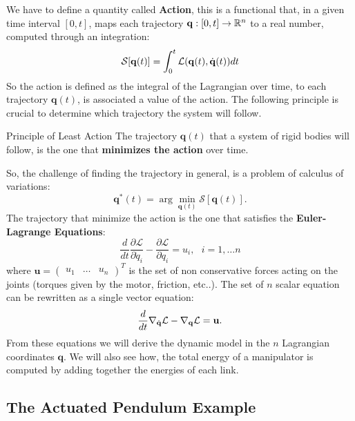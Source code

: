 \documentclass[10pt, a4paper]{report}
\newcommand{\q}{{\mathbf q}}
\begin{document}
We have to define a quantity called \textbf{Action}, this is a functional that, in a given time interval $[0,t]$, maps each trajectory $\q:[0,t]\rightarrow \R^n$ to a real number, computed through an integration:\begin{equation}
    \mathcal S[\q(t)]=\int_0^t\mathcal L(\q(t),\dq(t))dt
\end{equation}
So the action is defined as the integral of the Lagrangian over time, to each trajectory $\q(t)$, is associated a value of the action. The following principle is crucial to determine which trajectory the system will follow.
\begin{boxpostulate}{Principle of Least Action}{}
The trajectory $\q(t)$ that a system of rigid bodies will follow, is the one that \textbf{minimizes the action} over time.
\end{boxpostulate}
So, the challenge of finding the trajectory in general, is a problem of calculus of variations:\begin{equation}
    \q^*(t)=\arg\min_{\q(t)} \mathcal S[\q(t)].
\end{equation}
The trajectory that minimize the action is the one that satisfies the \textbf{Euler-Lagrange Equations}:\begin{equation}
    \frac{d}{dt}\frac{\partial \mathcal L}{\partial \dot q_i}-\frac{\partial \mathcal L}{\partial q_i}=u_i, \  \ \ i=1,\dots n
\end{equation}
where $\mathbf u=\begin{pmatrix}
    u_1&\dots & u_n
\end{pmatrix}^T$ is the set of non conservative forces acting on the joints (torques given by the motor, friction, etc..). The set of $n$ scalar equation can be rewritten as a single vector equation:\begin{equation}
    \frac{d}{dt}\nabla_{\dq}\mathcal L-\nabla_{\q}\mathcal L=\mathbf u.
\end{equation}
From these equations we will derive the dynamic model in the $n$ Lagrangian coordinates $\q$. We will also see how, the total energy of a manipulator is computed by adding together the energies of each link.\subsection{The Actuated Pendulum Example}
\end{document}
